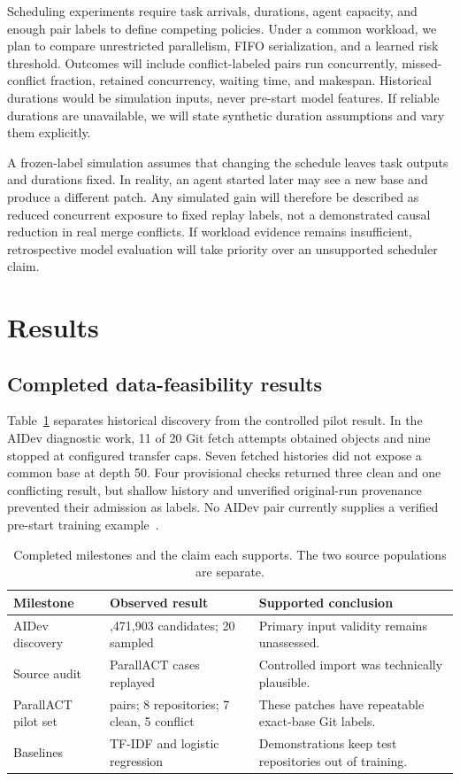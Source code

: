\documentclass[sigconf,authorversion,nonacm]{acmart}
\begin{document}
Scheduling experiments require task arrivals, durations, agent capacity, and enough pair labels to define competing policies. Under a common workload, we plan to compare unrestricted parallelism, FIFO serialization, and a learned risk threshold. Outcomes will include conflict-labeled pairs run concurrently, missed-conflict fraction, retained concurrency, waiting time, and makespan. Historical durations would be simulation inputs, never pre-start model features. If reliable durations are unavailable, we will state synthetic duration assumptions and vary them explicitly.

A frozen-label simulation assumes that changing the schedule leaves task outputs and durations fixed. In reality, an agent started later may see a new base and produce a different patch. Any simulated gain will therefore be described as reduced concurrent exposure to fixed replay labels, not a demonstrated causal reduction in real merge conflicts. If workload evidence remains insufficient, retrospective model evaluation will take priority over an unsupported scheduler claim.

\section{Results}
\subsection{Completed data-feasibility results}
Table~\ref{tab:milestones} separates historical discovery from the controlled pilot result. In the AIDev diagnostic work, 11 of 20 Git fetch attempts obtained objects and nine stopped at configured transfer caps. Seven fetched histories did not expose a common base at depth 50. Four provisional checks returned three clean and one conflicting result, but shallow history and unverified original-run provenance prevented their admission as labels. No AIDev pair currently supplies a verified pre-start training example~\cite{pilotresults}.

\begin{table}[t]
\caption{Completed milestones and the claim each supports. The two source populations are separate.}
\label{tab:milestones}
\centering
\begin{tabularx}{\columnwidth}{@{}>{\raggedright\arraybackslash}p{}>{\raggedright\arraybackslash}p{}>{\raggedright\arraybackslash}X@{}}
\toprule
Milestone & Observed result & Supported conclusion\\
\midrule
AIDev discovery & 1,471,903 candidates; 20 sampled & Primary input validity remains unassessed.\\
Source audit & 6 ParallACT cases replayed & Controlled import was technically plausible.\\
ParallACT pilot set & 12 pairs; 8 repositories; 7 clean, 5 conflict & These patches have repeatable exact-base Git labels.\\
Baselines & TF-IDF and logistic regression & Demonstrations keep test repositories out of training.\\
\bottomrule
\end{tabularx}
\end{table}
\end{document}
